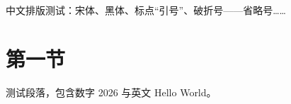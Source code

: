 \documentclass[UTF8]{ctexart}
\begin{document}
中文排版测试：宋体、黑体、标点“引号”、破折号——省略号……
\section{第一节}
测试段落，包含数字 2026 与英文 Hello World。
\end{document}

